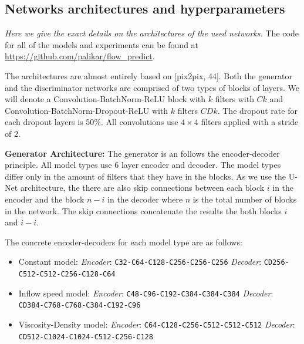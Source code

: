 \documentclass{llncs}
\begin{document}
\clearpage



\begin{subappendices}
\renewcommand{\thesection}{\Alph{section}}%

\section{Networks architectures and hyperparameters}
\emph{Here we give the exact details on the architectures of the used networks.}
The code for all of the models and experiments can be found at \url{https://github.com/palikar/flow_predict}.

The architectures are almost entirely based on [pix2pix, 44]. Both the generator and the discriminator networks are comprised of two types of blocks of layers. We will denote a Convolution-BatchNorm-ReLU block with $k$ filters with $Ck$ and Convolution-BatchNorm-Dropout-ReLU with $k$ filters $CDk$. The dropout rate for each dropout layers is 50\%. All convolutions use $4\times4$ filters applied with a stride of $2$.

\noindent\textbf{Generator Architecture:}
The generator is an follows the encoder-decoder principle. All model types use 6 layer encoder and decoder. The model types differ only in the amount of filters that they have in the blocks. As we use the U-Net architecture, the there are also skip connections between each block $i$ in the encoder and the block $n-i$ in the decoder where $n$ is the total number of blocks in the network. The skip connections concatenate the results the both blocks $i$ and $i-i$.

The concrete encoder-decoders for each model type are as follows:
\begin{itemize}
\item[\cdot] Constant model:\newline
  \emph{Encoder}: \texttt{C32-C64-C128-C256-C256-C256}\newline
  \emph{Decoder}: \texttt{CD256-C512-C512-C256-C128-C64}
\item[\cdot] Inflow speed model:\newline
  \emph{Encoder}: \texttt{C48-C96-C192-C384-C384-C384}\newline
  \emph{Decoder}: \texttt{CD384-C768-C768-C384-C192-C96}
\item[\cdot] Viscosity-Density model:\newline
  \emph{Encoder}: \texttt{C64-C128-C256-C512-C512-C512} \newline
  \emph{Decoder}: \texttt{CD512-C1024-C1024-C512-C256-C128}
\end{itemize}


\end{subappendices}
\end{document}
